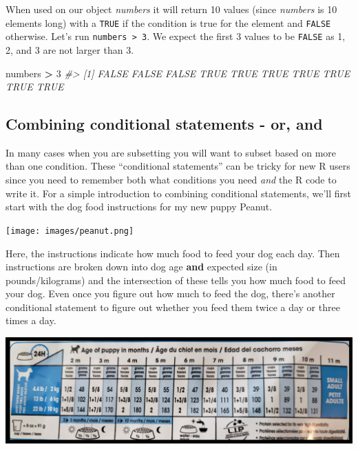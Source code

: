 \documentclass[
  12pt,
]{book}
\newenvironment{Shaded}{\begin{snugshade}}{\end{snugshade}}
\newcommand{\CommentTok}[1]{\textcolor[rgb]{0.37,0.37,0.37}{\textit{#1}}}
\newcommand{\DecValTok}[1]{\textcolor[rgb]{0.06,0.06,0.06}{#1}}
\newcommand{\NormalTok}[1]{#1}
\newcommand{\OperatorTok}[1]{\textcolor[rgb]{0.43,0.43,0.43}{\textbf{#1}}}
\newcommand{\StringTok}[1]{\textcolor[rgb]{0.5,0.5,0.5}{#1}}
\begin{document}
When used on our object \emph{numbers} it will return 10 values (since \emph{numbers} is 10 elements long) with a \texttt{TRUE} if the condition is true for the element and \texttt{FALSE} otherwise. Let's run \texttt{numbers\ \textgreater{}\ 3}. We expect the first 3 values to be \texttt{FALSE} as 1, 2, and 3 are not larger than 3.

\begin{Shaded}
\begin{Highlighting}[]
\NormalTok{numbers }\OperatorTok{\textgreater{}}\StringTok{ }\DecValTok{3}
\CommentTok{\#\textgreater{}  [1] FALSE FALSE FALSE  TRUE  TRUE  TRUE  TRUE  TRUE  TRUE  TRUE}
\end{Highlighting}
\end{Shaded}

\hypertarget{combining-conditional-statements---or-and}{%
\subsection{Combining conditional statements - or, and}\label{combining-conditional-statements---or-and}}

In many cases when you are subsetting you will want to subset based on more than one condition. These ``conditional statements'' can be tricky for new R users since you need to remember both what conditions you need \emph{and} the R code to write it. For a simple introduction to combining conditional statements, we'll first start with the dog food instructions for my new puppy Peanut.

\texttt{[image: images/peanut.png]}

Here, the instructions indicate how much food to feed your dog each day. Then instructions are broken down into dog age \textbf{and} expected size (in pounds/kilograms) and the intersection of these tells you how much food to feed your dog. Even once you figure out how much to feed the dog, there's another conditional statement to figure out whether you feed them twice a day or three times a day.

\includegraphics{images/dog_food.PNG}
\end{document}
